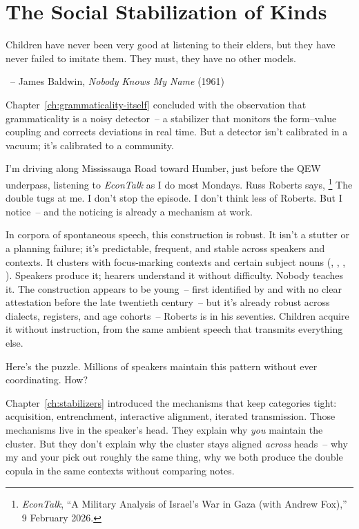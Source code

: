 \chapter{The Social Stabilization of Kinds}
\label{ch:social-stabilization}
\epigraph{Children have never been very good at listening to their elders, but they have never failed to imitate them. They must, they have no other models.}{~-- James Baldwin, \textit{Nobody Knows My Name} (1961)}

Chapter~\ref{ch:grammaticality-itself} concluded with the observation that grammaticality is a noisy detector~-- a stabilizer that monitors the form--value coupling and corrects deviations in real time. But a detector isn't calibrated in a vacuum; it's calibrated to a community.

I'm driving along Mississauga Road toward Humber, just before the QEW underpass, listening to \textit{EconTalk} as I do most Mondays. Russ Roberts says, \footnote{\textit{EconTalk}, \enquote{A Military Analysis of Israel's War in Gaza (with Andrew Fox),} 9 February 2026.} The double  tugs at me. I don't stop the episode. I don't think less of Roberts. But I notice~-- and the noticing is already a mechanism at work.

In corpora of spontaneous speech, this  construction is robust. It isn't a stutter or a planning failure; it's predictable, frequent, and stable across speakers and contexts. It clusters with focus-marking contexts and certain subject nouns (, , , ). Speakers produce it; hearers understand it without difficulty. Nobody teaches it. The construction appears to be young~-- first identified by \textcite{janda1980} and with no clear attestation before the late twentieth century~-- but it's already robust across dialects, registers, and age cohorts~-- Roberts is in his seventies. Children acquire it without instruction, from the same ambient speech that transmits everything else.

Here's the puzzle. Millions of speakers maintain this pattern without ever coordinating. How?

Chapter~\ref{ch:stabilizers} introduced the mechanisms that keep categories tight: acquisition, entrenchment, interactive alignment, iterated transmission. Those mechanisms live in the speaker's head. They explain why \emph{you} maintain the cluster. But they don't explain why the cluster stays aligned \emph{across} heads~-- why my  and your  pick out roughly the same thing, why we both produce the double copula in the same contexts without comparing notes.

